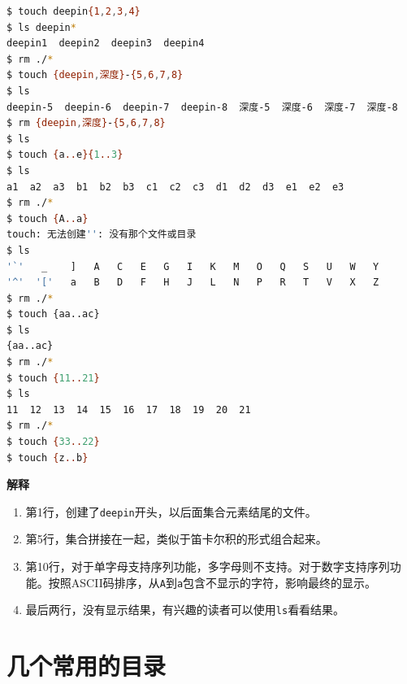 \documentclass[doctor,openright,twoside]{sjtuthesis}
\providecommand{\tightlist}{%
    \setlength{\itemsep}{0pt}\setlength{\parskip}{0pt}}
\newcommand{\passthrough}[1]{#1}
\theoremstyle{plain}
\theoremstyle{definition}
\theoremstyle{remark}
\theoremstyle{ocrenumbox}
\theoremstyle{plain}
\begin{document}
\begin{lstlisting}[language=bash]
$ touch deepin{1,2,3,4}
$ ls deepin*
deepin1  deepin2  deepin3  deepin4
$ rm ./*
$ touch {deepin,深度}-{5,6,7,8}
$ ls
deepin-5  deepin-6  deepin-7  deepin-8  深度-5  深度-6  深度-7  深度-8
$ rm {deepin,深度}-{5,6,7,8}
$ ls
$ touch {a..e}{1..3}
$ ls
a1  a2  a3  b1  b2  b3  c1  c2  c3  d1  d2  d3  e1  e2  e3
$ rm ./*
$ touch {A..a}
touch: 无法创建'': 没有那个文件或目录
$ ls
'`'   _    ]   A   C   E   G   I   K   M   O   Q   S   U   W   Y
'^'  '['   a   B   D   F   H   J   L   N   P   R   T   V   X   Z
$ rm ./*
$ touch {aa..ac}
$ ls
{aa..ac}
$ rm ./*
$ touch {11..21}
$ ls
11  12  13  14  15  16  17  18  19  20  21
$ rm ./*
$ touch {33..22}
$ touch {z..b}
\end{lstlisting}

\textbf{解释}

\begin{enumerate}
\def\labelenumi{\arabic{enumi}.}
\tightlist
\item
  第1行，创建了\passthrough{\lstinline!deepin!}开头，以后面集合元素结尾的文件。
\item
  第5行，集合拼接在一起，类似于笛卡尔积的形式组合起来。
\item
  第10行，对于单字母支持序列功能，多字母则不支持。对于数字支持序列功能。按照ASCII码排序，从\passthrough{\lstinline!A!}到\passthrough{\lstinline!a!}包含不显示的字符，影响最终的显示。
\item
  最后两行，没有显示结果，有兴趣的读者可以使用\passthrough{\lstinline!ls!}看看结果。
\end{enumerate}

\section{几个常用的目录}
\end{document}
